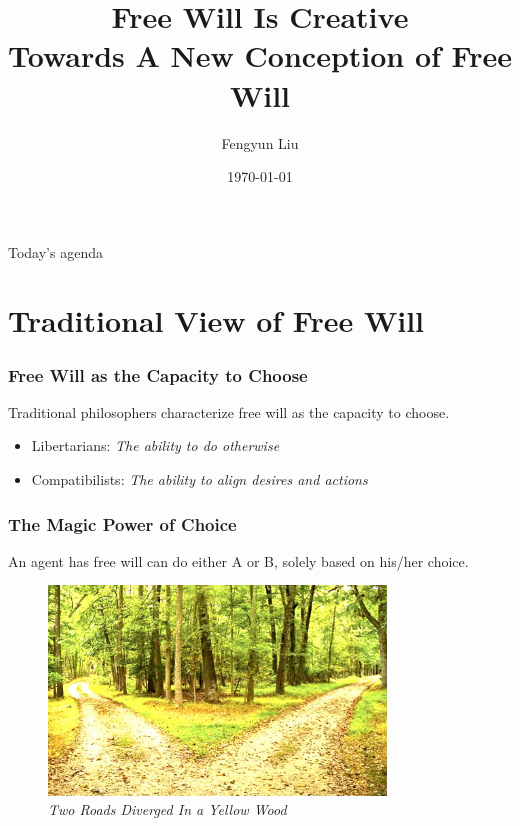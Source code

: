 \documentclass[xcolor=dvipsnames]{beamer}
\title[Free Will Is Creative]{Free Will Is Creative\\
{\small Towards A New Conception of Free Will}
}
\author{Fengyun Liu}
\institute[EPFL]{EPFL}
\date{\today}
\theoremstyle{definition}
\begin{document}
\begin{frame}
    \titlepage{}
\end{frame}
\begin{frame}{Today's agenda}
\tableofcontents[hideallsubsections,
    sections={1-6}
]
\end{frame}

\section{Traditional View of Free Will} %
\label{sec:Background}

\begin{frame}[fragile]
  \frametitle{Free Will as the Capacity to Choose}
  Traditional philosophers characterize free will as the \alert{capacity to choose}.

  \begin{itemize}
  \item Libertarians: \emph{The ability to do otherwise}
  \item Compatibilists: \emph{The ability to align desires and actions}
  \end{itemize}
\end{frame}

\begin{frame}[fragile]
  \frametitle{The Magic Power of Choice}
  An agent has free will can do either A or B, solely based on his/her choice.

  \begin{figure}
    \centering
    \includegraphics[width=0.8\textwidth]{images/woods.jpg}\\
    \emph{Two Roads Diverged In a Yellow Wood}
  \end{figure}
\end{frame}
\end{document}
